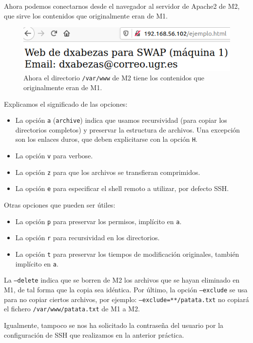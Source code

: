 \documentclass{article}
\begin{document}
Ahora podemos conectarnos desde el navegador al servidor de Apache2 de M2, que sirve los contenidos que originalmente eran de 
M1.

\begin{figure}[H]
	\centering
	\includegraphics[width=130mm]{imgs/rsync-example}
	\caption{Ahora el directorio \texttt{/var/www} de M2 tiene los contenidos que originalmente eran de M1.}
	\label{fig:rsync-example}
\end{figure}

Explicamos el significado de las opciones:
\begin{itemize}
	\item La opción \texttt{a} (\texttt{archive}) indica que usamos recursividad (para copiar los directorios completos) y preservar la estructura de archivos.
	Una excepción son los enlaces duros, que deben explicitarse con la opción \texttt{H}.
	\item La opción \texttt{v} para verbose.
	\item La opción \texttt{z} para que los archivos se transfieran comprimidos.
	\item La opción \texttt{e} para especificar el shell remoto a utilizar, por defecto SSH.
\end{itemize}

Otras opciones que pueden ser útiles:
\begin{itemize}
	\item La opción \texttt{p} para preservar los permisos, implícito en \texttt{a}.
	\item La opción \texttt{r} para recursividad en los directorios.
	\item La opción \texttt{t} para preservar los tiempos de modificación originales, también implícito en \texttt{a}.
\end{itemize}

La \texttt{--delete} indica que se borren de M2 los archivos que se hayan eliminado en M1, de tal forma que la copia sea idéntica.
Por último, la opción \texttt{--exclude} se usa para no copiar ciertos archivos, por ejemplo: \texttt{--exclude=**/patata.txt} no copiará
el fichero \texttt{/var/www/patata.txt} de M1 a M2.

Igualmente, tampoco se nos ha solicitado la contraseña del usuario por la configuración de SSH que realizamos en la anterior práctica.
\end{document}
